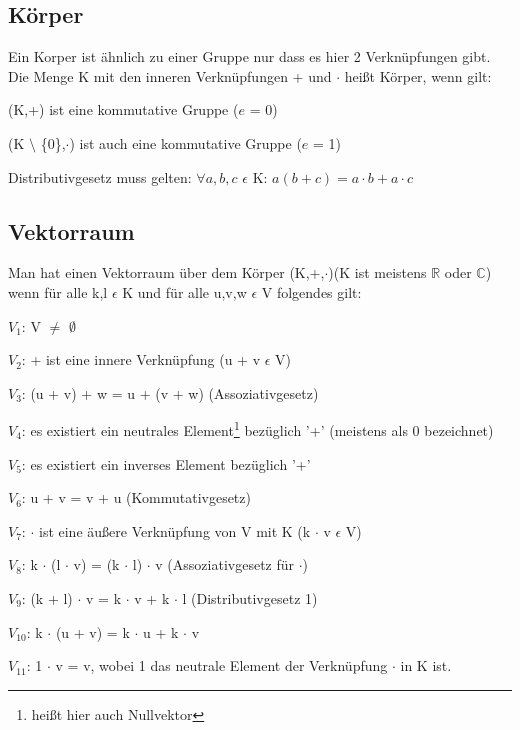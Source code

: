 \documentclass[a4paper,10pt]{scrartcl}
\begin{document}
        \subsection{Körper}
            Ein Korper ist ähnlich zu einer Gruppe nur dass es hier 2 Verknüpfungen gibt. Die Menge K mit den inneren Verknüpfungen + und $\cdot$ heißt Körper, wenn gilt:
            \begin{description}
                \item (K,+) ist eine kommutative Gruppe ($e$ = 0)
                \item (K $\setminus$ \{0\},$\cdot$) ist auch eine kommutative Gruppe ($e$ = 1)
                \item Distributivgesetz muss gelten: $\forall a,b,c$ $\epsilon$ K: $a(b + c) = a \cdot b + a \cdot c$
            \end{description}
            \newpage
        \subsection{Vektorraum}
            Man hat einen Vektorraum über dem Körper (K,+,$\cdot$)(K ist meistens $\mathbb{R}$ oder $\mathbb{C}$) 
            wenn für alle k,l $\epsilon$ K und für alle u,v,w $\epsilon$ V folgendes gilt:
            \begin{description}
                \item $V_1$: V $\neq$ $\emptyset$
                \item $V_2$: + ist eine innere Verknüpfung (u + v  $\epsilon$ V)
                \item $V_3$: (u + v) + w = u + (v + w) (Assoziativgesetz)
                \item $V_4$: es existiert ein neutrales Element\footnote{heißt hier auch Nullvektor} bezüglich '+' (meistens als 0 bezeichnet)
                \item $V_5$: es existiert ein inverses Element bezüglich '+' 
                \item $V_6$: u + v = v + u (Kommutativgesetz)
                \item $V_7$: $\cdot$ ist eine äußere Verknüpfung von V mit K (k $\cdot$ v $\epsilon$ V)
                \item $V_8$: k $\cdot$ (l $\cdot$ v) = (k $\cdot$ l) $\cdot$ v (Assoziativgesetz für $\cdot$)
                \item $V_9$: (k + l) $\cdot$ v = k $\cdot$ v + k $\cdot$ l (Distributivgesetz 1)
                \item $V_{10}$: k $\cdot$ (u + v) = k $\cdot$ u + k $\cdot$ v
                \item $V_{11}$: 1 $\cdot$ v = v, wobei 1 das neutrale Element der Verknüpfung $\cdot$ in K ist.
            \end{description} 
\end{document}
